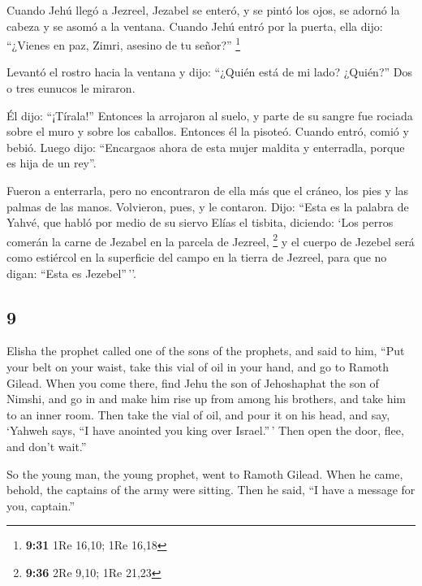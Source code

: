 \begin{paracol}{2}
 Cuando Jehú llegó a Jezreel, Jezabel se enteró, y se
pintó los ojos, se adornó la cabeza y se asomó a la ventana.
 Cuando Jehú entró por la puerta, ella dijo: ``¿Vienes en
paz, Zimri, asesino de tu señor?'' \footnote{\textbf{9:31} 1Re 16,10;
  1Re 16,18}

 Levantó el rostro hacia la ventana y dijo: ``¿Quién está
de mi lado? ¿Quién?'' Dos o tres eunucos le miraron.

 Él dijo: ``¡Tírala!'' Entonces la arrojaron al suelo, y
parte de su sangre fue rociada sobre el muro y sobre los caballos.
Entonces él la pisoteó.  Cuando entró, comió y bebió.
Luego dijo: ``Encargaos ahora de esta mujer maldita y enterradla, porque
es hija de un rey''.

 Fueron a enterrarla, pero no encontraron de ella más que
el cráneo, los pies y las palmas de las manos. 
Volvieron, pues, y le contaron. Dijo: ``Esta es la palabra de Yahvé, que
habló por medio de su siervo Elías el tisbita, diciendo: `Los perros
comerán la carne de Jezabel en la parcela de Jezreel, \footnote{\textbf{9:36}
  2Re 9,10; 1Re 21,23}  y el cuerpo de Jezebel será como
estiércol en la superficie del campo en la tierra de Jezreel, para que
no digan: ``Esta es Jezebel''\,''.

\switchcolumn
\begin{otherlanguage}{english}

\hypertarget{section-17}{%
\section{9}\label{section-17}}

 Elisha the prophet called one of the sons of the
prophets, and said to him, ``Put your belt on your waist, take this vial
of oil in your hand, and go to Ramoth Gilead.  When you
come there, find Jehu the son of Jehoshaphat the son of Nimshi, and go
in and make him rise up from among his brothers, and take him to an
inner room.  Then take the vial of oil, and pour it on his
head, and say, `Yahweh says, ``I have anointed you king over
Israel.''\,' Then open the door, flee, and don't wait.''

 So the young man, the young prophet, went to Ramoth
Gilead.  When he came, behold, the captains of the army
were sitting. Then he said, ``I have a message for you, captain.''


\end{otherlanguage}
\end{paracol}

